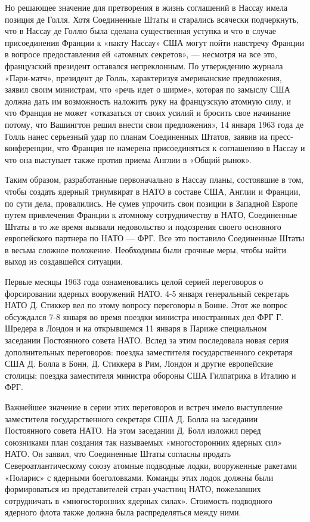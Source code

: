 \documentclass[12pt, a4paper, openany]{book}
\begin{document}
Но решающее значение для претворения в жизнь соглашений в Нассау имела позиция де Голля. Хотя Соединенные Штаты и старались всячески подчеркнуть, что в Нассау де Голлю была сделана существенная уступка и что в случае присоединения Франции к «пакту Нассау» США могут пойти навстречу Франции в вопросе предоставления ей «атомных секретов», — несмотря на все это, французский президент оставался непреклонным. По утверждению журнала «Пари-матч», президент де Голль, характеризуя американские предложения, заявил своим министрам, что «речь идет о ширме», которая по замыслу США должна дать им возможность наложить руку на французскую атомную силу, и что Франция не может «отказаться от своих усилий и бросить свое начинание потому, что Вашингтон решил внести свои предложения», 14 января 1963 года де Голль нанес серьезный удар по планам Соединенных Штатов, заявив иа пресс-конференции, что Франция не намерена присоединяться к соглашению в Нассау и что она выступает также против приема Англии в «Общий рынок».

Таким образом, разработанные первоначально в Нассау планы, состоявшие в том, чтобы создать ядерный триумвират в НАТО в составе США, Англии и Франции, по сути дела, провалились. Не сумев упрочить свои позиции в Западной Европе путем привлечения Франции к атомному сотрудничеству в НАТО, Соединенные Штаты в то же время вызвали недовольство и подозрения своего основного европейского партнера по НАТО — ФРГ. Все это поставило Соединенные Штаты в весьма сложное положение. Необходимы были срочные меры, чтобы найти выход из создавшейся ситуации.

Первые месяцы 1963 года ознаменовались целой серией переговоров о форсировании ядерных вооружений НАТО. 4-5 января генеральный секретарь НАТО Д. Стиккер вел по этому вопросу переговоры в Бонне. Этот же вопрос обсуждался 7-8 января во время поездки министра иностранных дел ФРГ Г. Шредера в Лондон и на открывшемся 11 января в Париже специальном заседании Постоянного совета НАТО. Вслед за этим последовала новая серия дополнительных переговоров: поездка заместителя государственного секретаря США Д. Болла в Бонн, Д. Стиккера в Рим, Лондон и другие европейские столицы; поездка заместителя министра обороны США Гилпатрика в Италию и ФРГ.

Важнейшее значение в серии этих переговоров и встреч имело выступление заместителя государственного секретаря США Д. Болла на заседании Постоянного совета НАТО. На этом заседании Д. Болл изложил перед союзниками план создания так называемых «многосторонних ядерных сил» НАТО. Он заявил, что Соединенные Штаты согласны продать Североатлантическому союзу атомные подводные лодки, вооруженные ракетами «Поларис» с ядерными боеголовками. Команды этих лодок должны были формироваться из представителей стран-участниц НАТО, пожелавших сотрудничать в «многосторонних ядерных силах». Стоимость подводного ядерного флота также должна была распределяться между ними.
\end{document}
